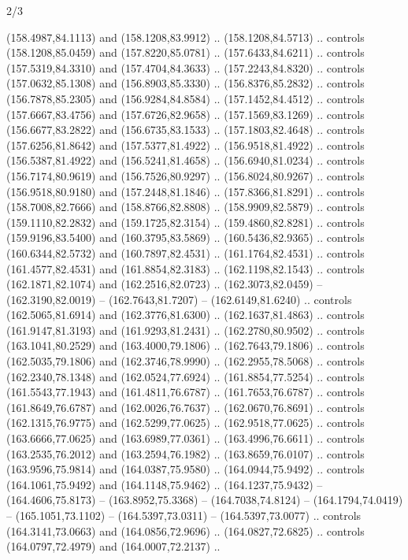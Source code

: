 \begin{flagdescription}{2/3}
\begin{scope}[xshift=0.5\flaglength,yshift=0.5\flagwidth,scale=\flagwidth/180]
\begin{scope}[y=0.8pt, x=0.8pt, yscale=-1,shift={(-168.75,-108.75)}]
  (158.4987,84.1113) and (158.1208,83.9912) .. (158.1208,84.5713) .. controls
  (158.1208,85.0459) and (157.8220,85.0781) .. (157.6433,84.6211) .. controls
  (157.5319,84.3310) and (157.4704,84.3633) .. (157.2243,84.8320) .. controls
  (157.0632,85.1308) and (156.8903,85.3330) .. (156.8376,85.2832) .. controls
  (156.7878,85.2305) and (156.9284,84.8584) .. (157.1452,84.4512) .. controls
  (157.6667,83.4756) and (157.6726,82.9658) .. (157.1569,83.1269) .. controls
  (156.6677,83.2822) and (156.6735,83.1533) .. (157.1803,82.4648) .. controls
  (157.6256,81.8642) and (157.5377,81.4922) .. (156.9518,81.4922) .. controls
  (156.5387,81.4922) and (156.5241,81.4658) .. (156.6940,81.0234) .. controls
  (156.7174,80.9619) and (156.7526,80.9297) .. (156.8024,80.9267) .. controls
  (156.9518,80.9180) and (157.2448,81.1846) .. (157.8366,81.8291) .. controls
  (158.7008,82.7666) and (158.8766,82.8808) .. (158.9909,82.5879) .. controls
  (159.1110,82.2832) and (159.1725,82.3154) .. (159.4860,82.8281) .. controls
  (159.9196,83.5400) and (160.3795,83.5869) .. (160.5436,82.9365) .. controls
  (160.6344,82.5732) and (160.7897,82.4531) .. (161.1764,82.4531) .. controls
  (161.4577,82.4531) and (161.8854,82.3183) .. (162.1198,82.1543) .. controls
  (162.1871,82.1074) and (162.2516,82.0723) .. (162.3073,82.0459) --
  (162.3190,82.0019) -- (162.7643,81.7207) -- (162.6149,81.6240) .. controls
  (162.5065,81.6914) and (162.3776,81.6300) .. (162.1637,81.4863) .. controls
  (161.9147,81.3193) and (161.9293,81.2431) .. (162.2780,80.9502) .. controls
  (163.1041,80.2529) and (163.4000,79.1806) .. (162.7643,79.1806) .. controls
  (162.5035,79.1806) and (162.3746,78.9990) .. (162.2955,78.5068) .. controls
  (162.2340,78.1348) and (162.0524,77.6924) .. (161.8854,77.5254) .. controls
  (161.5543,77.1943) and (161.4811,76.6787) .. (161.7653,76.6787) .. controls
  (161.8649,76.6787) and (162.0026,76.7637) .. (162.0670,76.8691) .. controls
  (162.1315,76.9775) and (162.5299,77.0625) .. (162.9518,77.0625) .. controls
  (163.6666,77.0625) and (163.6989,77.0361) .. (163.4996,76.6611) .. controls
  (163.2535,76.2012) and (163.2594,76.1982) .. (163.8659,76.0107) .. controls
  (163.9596,75.9814) and (164.0387,75.9580) .. (164.0944,75.9492) .. controls
  (164.1061,75.9492) and (164.1148,75.9462) .. (164.1237,75.9432) --
  (164.4606,75.8173) -- (163.8952,75.3368) -- (164.7038,74.8124) --
  (164.1794,74.0419) -- (165.1051,73.1102) -- (164.5397,73.0311) --
  (164.5397,73.0077) .. controls (164.3141,73.0663) and (164.0856,72.9696) ..
  (164.0827,72.6825) .. controls (164.0797,72.4979) and (164.0007,72.2137) ..

\end{scope}
\end{scope}
\end{flagdescription}
